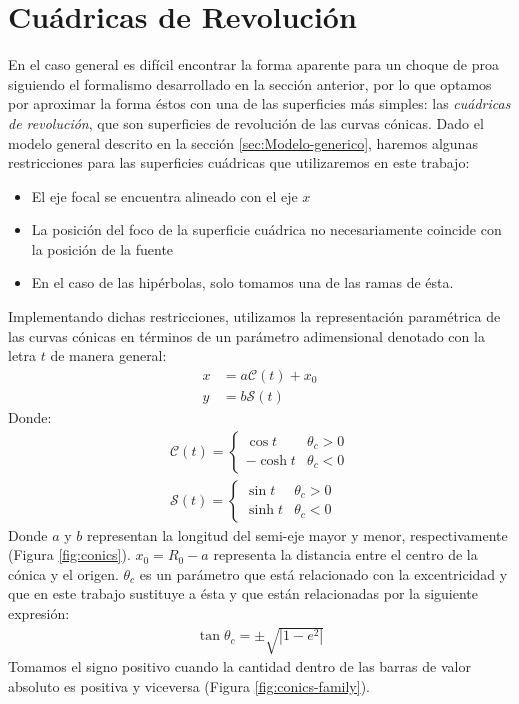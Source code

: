 \section{Cuádricas de Revolución}

\newcommand\Sin{\ensuremath{\mathcal{S}}}
\newcommand\Cos{\ensuremath{\mathcal{C}}}
\newcommand\Cot{\ensuremath{\mathcal{T}}}


En el caso general es difícil encontrar la forma aparente para un choque de
proa siguiendo el formalismo desarrollado en la sección anterior, por lo que
optamos por aproximar la forma éstos con una de las superficies más simples:
las \textit{cuádricas de revolución}, que son superficies de revolución de
las curvas cónicas. Dado el modelo general descrito en la sección
\ref{sec:Modelo-generico}, haremos algunas restricciones para las superficies
cuádricas que utilizaremos en este trabajo:
\begin{itemize}
  \item El eje focal se encuentra alineado con el eje $x$
  \item La posición del foco de la superficie cuádrica no necesariamente coincide
    con la posición de la fuente
  \item En el caso de las hipérbolas, solo tomamos una de las ramas de ésta.
\end{itemize}
Implementando dichas restricciones, utilizamos la representación paramétrica de
las curvas cónicas en términos de un parámetro adimensional denotado con la letra
$t$ de manera general:
\begin{align}
  x &= a\Cos(t) + x_0\\
  y &= b\Sin(t) 
\end{align}
Donde:
\begin{align}
  \Cos(t) =\left\lbrace
  \begin{array}{lr}
    \cos{t} & \theta_c > 0\\
    -\cosh{t} & \theta_c < 0        
  \end{array}\right. \\
  \Sin(t) = \left\lbrace
  \begin{array}{lr}
    \sin{t} & \theta_c > 0\\
    \sinh{t}  & \theta_c < 0
  \end{array} \right.
\end{align}
Donde $a$ y $b$ representan la longitud del semi-eje mayor y menor, respectivamente (Figura \ref{fig:conics}).
$x_0 = R_0 - a$ representa la distancia entre el centro de la cónica y el origen. 
$\theta_c$ es un parámetro que está relacionado con la excentricidad y que en este
trabajo sustituye a ésta y que están relacionadas por la siguiente expresión:
\begin{align}
  \tan\theta_c = \pm\sqrt{\left|1-e^2\right|}
\end{align}
Tomamos el signo positivo cuando la cantidad dentro de las barras de valor absoluto es
positiva y viceversa (Figura \ref{fig:conics-family}). 

